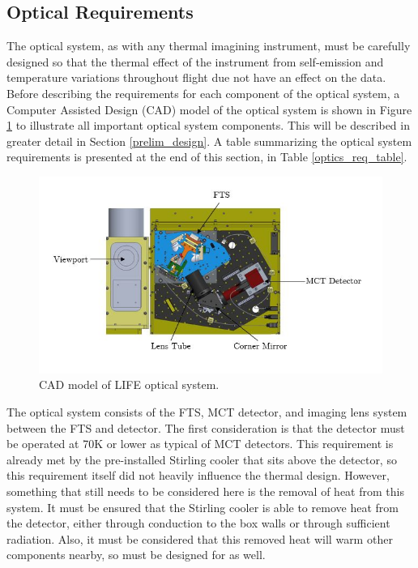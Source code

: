 \subsection{Optical Requirements}
The optical system, as with any thermal imagining instrument, must be carefully designed so that the thermal effect of the instrument from self-emission and temperature variations throughout flight due not have an effect on the data. Before describing the requirements for each component of the optical system, a Computer Assisted Design (CAD) model of the optical system is shown in Figure \ref{fig:optical_system_diagram} to illustrate all important optical system components. This will be described in greater detail in Section \ref{prelim_design}. A table summarizing the optical system requirements is presented at the end of this section, in Table \ref{optics_req_table}.

\begin{figure}[h]
\centering
  \includegraphics[width=\linewidth]{chap3_images/optical_system_diagram.JPG}
  \caption{CAD model of LIFE optical system.}
  \label{fig:optical_system_diagram}
\end{figure}

The optical system consists of the FTS, MCT detector, and imaging lens system between the FTS and detector. The first consideration is that the detector must be operated at 70K or lower as typical of MCT detectors. This requirement is already met by the pre-installed Stirling cooler that sits above the detector, so this requirement itself did not heavily influence the thermal design. However, something that still needs to be considered here is the removal of heat from this system. It must be ensured that the Stirling cooler is able to remove heat from the detector, either through conduction to the box walls or through sufficient radiation. Also, it must be considered that this removed heat will warm other components nearby, so must be designed for as well.

